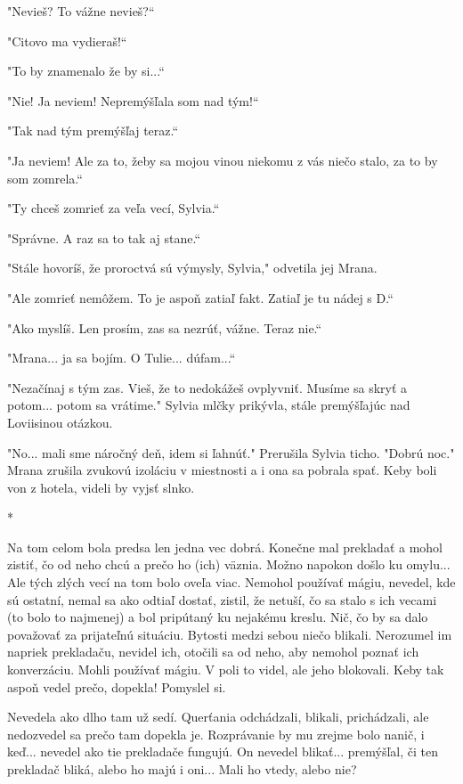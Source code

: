 \documentclass{book}
\begin{document}
"$ $Nevieš? To vážne nevieš?“

"$ $Citovo ma vydieraš!“

"$ $To by znamenalo že by si...“

"$ $Nie! Ja neviem! Nepremýšľala som nad tým!“

"$ $Tak nad tým premýšľaj teraz.“

"$ $Ja neviem! Ale za to, žeby sa mojou vinou niekomu z vás niečo stalo, za to by som zomrela.“

"$ $Ty chceš zomrieť za veľa vecí, Sylvia.“

"$ $Správne. A raz sa to tak aj stane.“

"$ $Stále hovoríš, že proroctvá sú výmysly, Sylvia,"$ $ odvetila jej Mrana.

"$ $Ale zomrieť nemôžem. To je aspoň zatiaľ fakt. Zatiaľ je tu nádej s D.“

"$ $Ako myslíš. Len prosím, zas sa nezrúť, vážne. Teraz nie.“

"$ $Mrana... ja sa bojím. O Tulie... dúfam...“

"$ $Nezačínaj s tým zas. Vieš, že to nedokážeš ovplyvniť. Musíme sa skryť a potom... potom sa vrátime."$ $ Sylvia mlčky prikývla, stále premýšľajúc nad Loviisinou otázkou.

"$ $No... mali sme náročný deň, idem si ľahnúť."$ $ Prerušila Sylvia ticho. "$ $Dobrú noc."$ $ Mrana zrušila zvukovú izoláciu v miestnosti a i ona sa pobrala spať. Keby boli von z hotela, videli by vyjsť slnko.

\begin{center}

*

\end{center}

Na tom celom bola predsa len jedna vec dobrá. Konečne mal prekladať a mohol zistiť, čo od neho chcú a prečo ho (ich) väznia. Možno napokon došlo ku omylu... Ale tých zlých vecí na tom bolo oveľa viac. Nemohol používať mágiu, nevedel, kde sú ostatní, nemal sa ako odtiaľ dostať, zistil, že netuší, čo sa stalo s ich vecami (to bolo to najmenej) a bol pripútaný ku nejakému kreslu. Nič, čo by sa dalo považovať za prijateľnú situáciu. Bytosti medzi sebou niečo blikali. Nerozumel im napriek prekladaču, nevidel ich, otočili sa od neho, aby nemohol poznať ich konverzáciu. Mohli používať mágiu. V poli to videl, ale jeho blokovali. Keby tak aspoň vedel prečo, dopekla! Pomyslel si.

Nevedela ako dlho tam už sedí. Querťania odchádzali, blikali, prichádzali, ale nedozvedel sa prečo tam dopekla je. Rozprávanie by mu zrejme bolo nanič, i keď... nevedel ako tie prekladače fungujú. On nevedel blikať... premýšľal, či ten prekladač bliká, alebo ho majú i oni... Mali ho vtedy, alebo nie?
\end{document}
